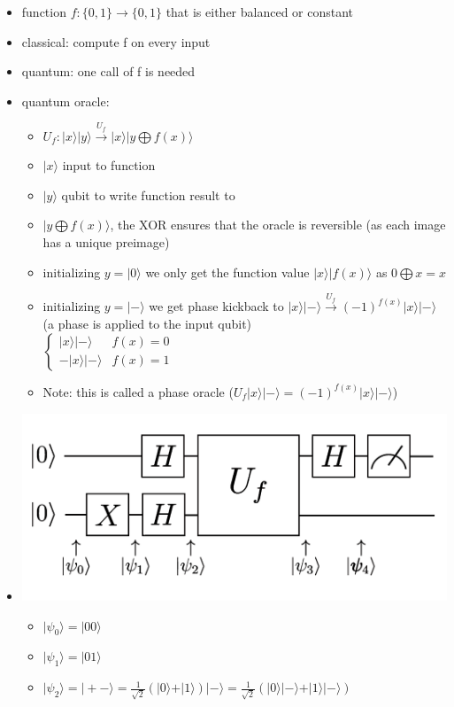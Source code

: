 \documentclass[12pt,a4paper]{article}
\newcommand{\ecb}[1]{\{#1\}}
\newcommand{\ket}[1]{\vert #1 \rangle}
\begin{document}
\begin{itemize}
\item function $f : \ecb{0,1}\rightarrow \ecb{0,1}$ that is either balanced or constant
\item classical: compute f on every input
\item quantum: one call of f is needed
\item quantum oracle:
\begin{itemize}
\item $U_f : \ket{x}\ket{y} \xrightarrow{U_f} \ket{x}\ket{y\bigoplus f(x)}$
\item $\ket{x}$ input to function
\item $\ket{y}$ qubit to write function result to
\item $\ket{y\bigoplus f(x)}$, the XOR ensures that the oracle is reversible (as each image has a unique preimage)
\item initializing $y = \ket{0}$ we only get the function value $\ket{x}\ket{f(x)}$ as $0\bigoplus x = x$
\item initializing $y = \ket{-}$ we get phase kickback to $\ket{x}\ket{-} \xrightarrow{U_f} (-1)^{f(x)} \ket{x}\ket{-}$ (a phase is applied to the input qubit)\\$\begin{cases} \ket{x}\ket{-} & f(x)=0 \\ -\ket{x}\ket{-} & f(x)=1 \end{cases}$
\item Note: this is called a phase oracle ($U_f \ket{x}\ket{-} = (-1)^{f(x)}\ket{x}\ket{-}$)
\end{itemize}
\item \includegraphics[scale=0.2]{./resources/deutschplan.png}
\begin{itemize}
\item $\ket{\psi_0} = \ket{00}$
\item $\ket{\psi_1} = \ket{01}$
\item $\ket{\psi_2} = \ket{+-} = \frac{1}{\sqrt{2}}(\ket{0} + \ket{1})\ket{-} = \frac{1}{\sqrt{2}}(\ket{0}\ket{-}+\ket{1}\ket{-})$

\end{itemize}
\end{itemize}
\end{document}
